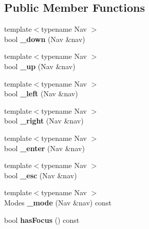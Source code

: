 \subsection*{Public Member Functions}
\begin{DoxyCompactItemize}
\item 
\mbox{\label{classItemNav_a88d3da019727c248ca83b6a5bd1b6ae3}} 
{\footnotesize template$<$typename Nav $>$ }\\bool {\bfseries \+\_\+down} (Nav \&nav)
\item 
\mbox{\label{classItemNav_a97d9b170b12a5e934233fda1c116b34b}} 
{\footnotesize template$<$typename Nav $>$ }\\bool {\bfseries \+\_\+up} (Nav \&nav)
\item 
\mbox{\label{classItemNav_a35fce8f3e0412ec96715e071000e7959}} 
{\footnotesize template$<$typename Nav $>$ }\\bool {\bfseries \+\_\+left} (Nav \&nav)
\item 
\mbox{\label{classItemNav_a4c50b94f9483147cab5a8e732b8475c0}} 
{\footnotesize template$<$typename Nav $>$ }\\bool {\bfseries \+\_\+right} (Nav \&nav)
\item 
\mbox{\label{classItemNav_a73524b209a2442d9921a273ed3718af9}} 
{\footnotesize template$<$typename Nav $>$ }\\bool {\bfseries \+\_\+enter} (Nav \&nav)
\item 
\mbox{\label{classItemNav_a45181d1d1ccbd98500cb2ac060b11ec2}} 
{\footnotesize template$<$typename Nav $>$ }\\bool {\bfseries \+\_\+esc} (Nav \&nav)
\item 
\mbox{\label{classItemNav_a09e97ff88aaecb6558ebb1c73ca7b087}} 
{\footnotesize template$<$typename Nav $>$ }\\Modes {\bfseries \+\_\+mode} (Nav \&nav) const
\item 
\mbox{\label{classItemNav_a6436da73b229fa1ed0fef06113849489}} 
bool {\bfseries has\+Focus} () const
\end{DoxyCompactItemize}
